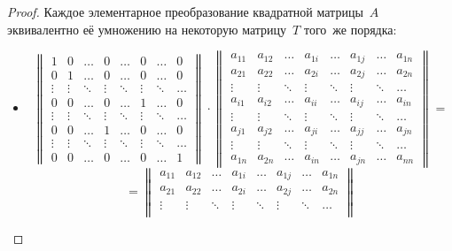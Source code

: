 \begin{proof}
Каждое элементарное преобразование квадратной матрицы~$A$ эквивалентно её умножению на некоторую матрицу~$T$ того~же порядка:
\begin{itemize}
	\item \begin{equation*}
	\begin{Vmatrix}
	1 & 0 & \ldots & 0 & \ldots & 0 & \ldots & 0 \\
	0 & 1 & \ldots & 0 & \ldots & 0 & \ldots & 0 \\
	\vdots & \vdots & \ddots & \vdots & \ddots & \vdots & \ddots & \ldots \\
	0 & 0 & \ldots & 0 & \ldots & 1 & \ldots & 0 \\
	\vdots & \vdots & \ddots & \vdots & \ddots & \vdots & \ddots & \ldots \\
	0 & 0 & \ldots & 1 & \ldots & 0 & \ldots & 0 \\
	\vdots & \vdots & \ddots & \vdots & \ddots & \vdots & \ddots & \ldots \\
	0 & 0 & \ldots & 0 & \ldots & 0 & \ldots & 1
	\end{Vmatrix} \cdot
	\begin{Vmatrix}
	a_{11} & a_{12} & \ldots & a_{1i} & \ldots & a_{1j} & \ldots & a_{1n} \\
	a_{21} & a_{22} & \ldots & a_{2i} & \ldots & a_{2j} & \ldots & a_{2n} \\
	\vdots & \vdots & \ddots & \vdots & \ddots & \vdots & \ddots & \ldots \\
	a_{i1} & a_{i2} & \ldots & a_{ii} & \ldots & a_{ij} & \ldots & a_{in} \\
	\vdots & \vdots & \ddots & \vdots & \ddots & \vdots & \ddots & \ldots \\
	a_{j1} & a_{j2} & \ldots & a_{ji} & \ldots & a_{jj} & \ldots & a_{jn} \\
	\vdots & \vdots & \ddots & \vdots & \ddots & \vdots & \ddots & \ldots \\
	a_{1n} & a_{2n} & \ldots & a_{in} & \ldots & a_{jn} & \ldots & a_{nn}
	\end{Vmatrix} =
	\end{equation*}
	\begin{equation*}
	= \begin{Vmatrix}
	a_{11} & a_{12} & \ldots & a_{1i} & \ldots & a_{1j} & \ldots & a_{1n} \\
	a_{21} & a_{22} & \ldots & a_{2i} & \ldots & a_{2j} & \ldots & a_{2n} \\
	\vdots & \vdots & \ddots & \vdots & \ddots & \vdots & \ddots & \ldots \\

\end{Vmatrix}
\end{equation*}
\end{itemize}
\end{proof}

